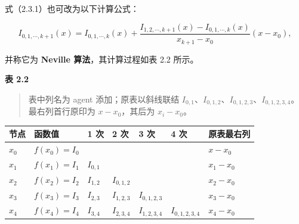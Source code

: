 \documentclass[
  10pt,
  fontset=fandol]{ctexart}
\newcounter{none} %
\begin{document}
式（2.3.1）也可改为以下计算公式：

\[
I_{0,1,\cdots,k+1}(x)
=I_{0,1,\cdots,k}(x)
+\frac{I_{1,2,\cdots,k+1}(x)-I_{0,1,\cdots,k}(x)}
{x_{k+1}-x_0}(x-x_0),
\tag{2.3.2}
\]

并称它为 \textbf{Neville 算法}，其计算过程如表 2.2 所示。

\textbf{表 2.2}

\begin{quote}
表中列名为 agent 添加；原表以斜线联结 \(I_{0,1}\)、\(I_{0,1,2}\)、\(I_{0,1,2,3}\)、\(I_{0,1,2,3,4}\)。最右列首行原印为 \(x-x_0\)，其后为 \(x_i-x_0\)。
\end{quote}

{\def\LTcaptype{none} %
\begin{longtable}[]{@{}
  >{\raggedright\arraybackslash}p{}
  >{\raggedright\arraybackslash}p{}
  >{\raggedright\arraybackslash}p{}
  >{\raggedright\arraybackslash}p{}
  >{\raggedright\arraybackslash}p{}
  >{\raggedright\arraybackslash}p{}
  >{\raggedright\arraybackslash}p{}@{}}
\toprule\noalign{}
\begin{minipage}[b]{\linewidth}\raggedright
节点
\end{minipage} & \begin{minipage}[b]{\linewidth}\raggedright
函数值
\end{minipage} & \begin{minipage}[b]{\linewidth}\raggedright
1 次
\end{minipage} & \begin{minipage}[b]{\linewidth}\raggedright
2 次
\end{minipage} & \begin{minipage}[b]{\linewidth}\raggedright
3 次
\end{minipage} & \begin{minipage}[b]{\linewidth}\raggedright
4 次
\end{minipage} & \begin{minipage}[b]{\linewidth}\raggedright
原表最右列
\end{minipage} \\
\midrule\noalign{}
\endhead
\bottomrule\noalign{}
\endlastfoot
\(x_0\) & \(f(x_0)=I_0\) & & & & & \(x-x_0\) \\
\(x_1\) & \(f(x_1)=I_1\) & \(I_{0,1}\) & & & & \(x_1-x_0\) \\
\(x_2\) & \(f(x_2)=I_2\) & \(I_{1,2}\) & \(I_{0,1,2}\) & & & \(x_2-x_0\) \\
\(x_3\) & \(f(x_3)=I_3\) & \(I_{2,3}\) & \(I_{1,2,3}\) & \(I_{0,1,2,3}\) & & \(x_3-x_0\) \\
\(x_4\) & \(f(x_4)=I_4\) & \(I_{3,4}\) & \(I_{2,3,4}\) & \(I_{1,2,3,4}\) & \(I_{0,1,2,3,4}\) & \(x_4-x_0\) \\
\end{longtable}
}
\end{document}
